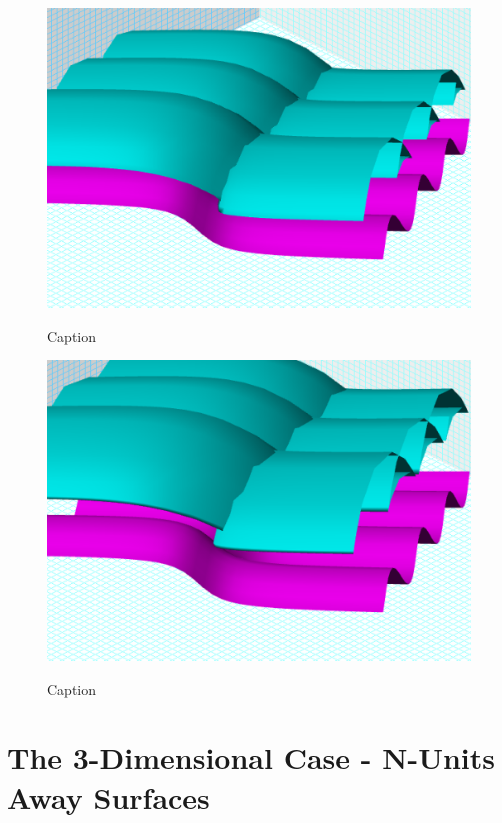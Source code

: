 {\begin{figure}[H]
    \begin{minipage}[b]{\w}
      \centering
      \label{surface:8}
      \includegraphics[width=\fw]{img/16-surface/08.png}
      \caption{Caption}
      \vspace{4ex}
    \end{minipage} %
    \begin{minipage}[b]{\w}
      \centering
      \label{surface:9}
      \includegraphics[width=\fw]{img/16-surface/09.png}
      \caption{Caption}
      \vspace{4ex}
    \end{minipage} %
  \end{figure}

}

\section{The 3-Dimensional Case - N-Units Away Surfaces}

